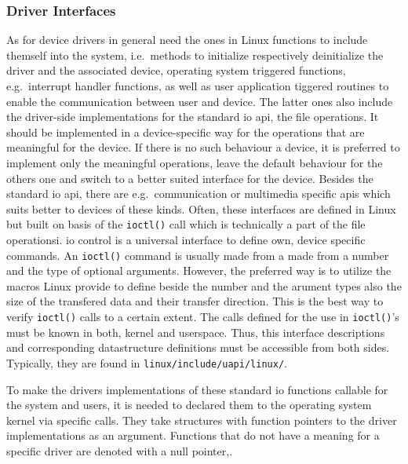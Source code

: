 \subsubsection*{Driver Interfaces}
As for device drivers in general need the ones in Linux functions to include themself into the system, i.e.\ methods to initialize respectively deinitialize the driver and the associated device, operating system triggered functions, e.g.\ interrupt handler functions, as well as user application tiggered routines to enable the communication between user and device\cite{quade2016Linux}.
The latter ones also include the driver-side implementations for the standard \ac{io} \ac{api}, the file operations.
It should be implemented in a device-specific way for the operations that are meaningful for the device.
If there is no such behaviour a device, it is preferred to implement only the meaningful operations, leave the default behaviour for the others one and switch to a better suited interface for the device.
Besides the standard \ac{io} \ac{api}, there are e.g.\ communication or multimedia specific \acp{api} which suits better to devices of these kinds.
Often, these interfaces are defined in Linux but built on basis of the \texttt{ioctl()} call which is technically a part of the file operationsi\cite{quade2016Linux}.
\ac{io} control is a universal interface to define own, device specific commands.
An \texttt{ioctl()} command is usually made from a made from a number and the type of optional arguments.
However, the preferred way is to utilize the macros Linux provide to define beside the number and the arument types also the size of the transfered data and their transfer direction\cite{quade2016Linux}.
This is the best way to verify \texttt{ioctl()} calls to a certain extent.
The calls defined for the use in \texttt{ioctl()}'s must be known in both, kernel and userspace.
Thus, this interface descriptions and corresponding datastructure definitions must be accessible from both sides.
Typically, they are found in \texttt{linux/include/uapi/linux/}\cite{quade2016Linux}.

To make the drivers implementations of these standard \ac{io} functions callable for the system and users, it is needed to declared them to the operating system kernel via specific calls.
They take structures with function pointers to the driver implementations as an argument.
Functions that do not have a meaning for a specific driver are denoted with a null pointer\cite{glatz2015betriebssysteme},\cite{quade2016Linux}.


